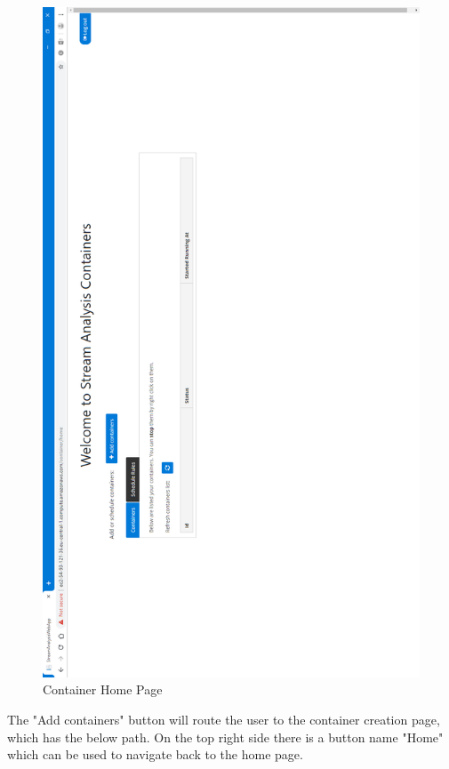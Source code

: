 \begin{figure}[p]
	\centering
	\noindent
	\includegraphics[width=0.5\paperwidth]{./images/guide/container/home.PNG}
	\caption{Container Home Page}
	\label{fig:containerHome}
\end{figure}

The "Add containers" button will route the user to the container creation page, which has the below path. On the top right side there is a button name "Home" which can be used to navigate back to the home page.\\

